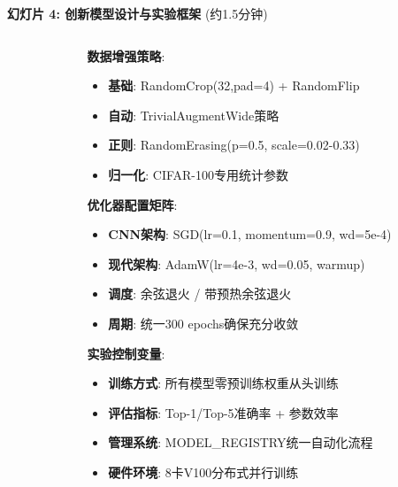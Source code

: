 \documentclass[10pt]{beamer}
\begin{document}
\begin{frame}{\textbf{幻灯片 4: 创新模型设计与实验框架} (约1.5分钟)}
{\begin{columns}[T]
\begin{column}{0.48\textwidth}
        
    \end{column}
    \begin{column}{0.48\textwidth}
        \textbf{数据增强策略}:
        \begin{itemize}
            \item \textbf{基础}: RandomCrop(32,pad=4) + RandomFlip
            \item \textbf{自动}: TrivialAugmentWide策略
            \item \textbf{正则}: RandomErasing(p=0.5, scale=0.02-0.33)
            \item \textbf{归一化}: CIFAR-100专用统计参数
        \end{itemize}
        \textbf{优化器配置矩阵}:
        \begin{itemize}
            \item \textbf{CNN架构}: SGD(lr=0.1, momentum=0.9, wd=5e-4)
            \item \textbf{现代架构}: AdamW(lr=4e-3, wd=0.05, warmup)
            \item \textbf{调度}: 余弦退火 / 带预热余弦退火
            \item \textbf{周期}: 统一300 epochs确保充分收敛
        \end{itemize}
        \textbf{实验控制变量}:
        \begin{itemize}
            \item \textbf{训练方式}: 所有模型零预训练权重从头训练
            \item \textbf{评估指标}: Top-1/Top-5准确率 + 参数效率
            \item \textbf{管理系统}: MODEL\_REGISTRY统一自动化流程
            \item \textbf{硬件环境}: 8卡V100分布式并行训练
        \end{itemize}
    \end{column}
\end{columns}
}

\end{frame}
\end{document}
